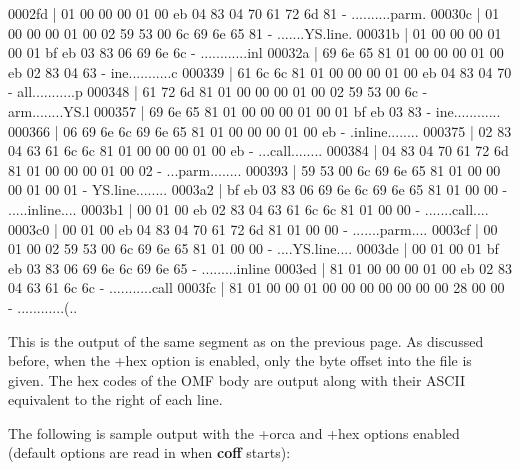 0002fd | 01 00 00 00 01 00 eb 04 83 04 70 61 72 6d 81 - ..........parm.
00030c | 01 00 00 00 01 00 02 59 53 00 6c 69 6e 65 81 - .......YS.line.
00031b | 01 00 00 00 01 00 01 bf eb 03 83 06 69 6e 6c - ............inl
00032a | 69 6e 65 81 01 00 00 00 01 00 eb 02 83 04 63 - ine...........c
000339 | 61 6c 6c 81 01 00 00 00 01 00 eb 04 83 04 70 - all...........p
000348 | 61 72 6d 81 01 00 00 00 01 00 02 59 53 00 6c - arm........YS.l
000357 | 69 6e 65 81 01 00 00 00 01 00 01 bf eb 03 83 - ine............
000366 | 06 69 6e 6c 69 6e 65 81 01 00 00 00 01 00 eb - .inline........
000375 | 02 83 04 63 61 6c 6c 81 01 00 00 00 01 00 eb - ...call........
000384 | 04 83 04 70 61 72 6d 81 01 00 00 00 01 00 02 - ...parm........
000393 | 59 53 00 6c 69 6e 65 81 01 00 00 00 01 00 01 - YS.line........
0003a2 | bf eb 03 83 06 69 6e 6c 69 6e 65 81 01 00 00 - .....inline....
0003b1 | 00 01 00 eb 02 83 04 63 61 6c 6c 81 01 00 00 - .......call....
0003c0 | 00 01 00 eb 04 83 04 70 61 72 6d 81 01 00 00 - .......parm....
0003cf | 00 01 00 02 59 53 00 6c 69 6e 65 81 01 00 00 - ....YS.line....
0003de | 00 01 00 01 bf eb 03 83 06 69 6e 6c 69 6e 65 - .........inline
0003ed | 81 01 00 00 00 01 00 eb 02 83 04 63 61 6c 6c - ...........call
0003fc | 81 01 00 00 01 00 00 00 00 00 00 00 28 00 00 - ............(..
\endsample
\medskip

\description
This is the output of the same segment as on the previous page. As discussed
before, when the +hex option is enabled, only the byte offset into the file
is given. The hex codes of the OMF body are output along with their ASCII
equivalent to the right of each line.

\vfill\eject

\description
The following is sample output with the +orca and +hex options enabled
(default options are read in when {\bf coff} starts):

